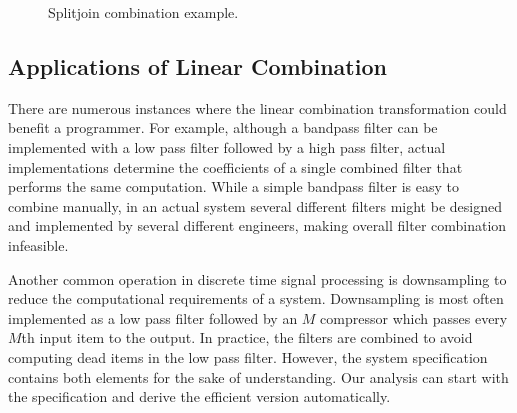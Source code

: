 {\begin{figure}[t]
\center
\epsfxsize=2.2in
\caption{Splitjoin combination example.}
\protect\label{fig:example-splitjoin-combination}
\vspace{-12pt}
\end{figure}


\subsection{Applications of Linear Combination}



There are numerous instances where the linear combination
transformation could benefit a programmer.  For example, although a
bandpass filter can be implemented with a low pass filter followed by
a high pass filter, actual implementations determine the
coefficients of a single combined filter that performs the same
computation. While a simple bandpass filter is easy to combine
manually, in an actual system several different filters might be
designed and implemented by several different engineers, making 
overall filter combination infeasible.

Another common operation in discrete time signal processing is
downsampling to reduce the computational requirements of a system.
Downsampling is most often implemented as a low pass filter followed
by an $M$ compressor which passes every $M$th input item to the
output.  In practice, the filters are combined to avoid computing dead
items in the low pass filter.  However, the system specification
contains both elements for the sake of understanding.  Our analysis can
start with the specification and derive the efficient version automatically.

}
